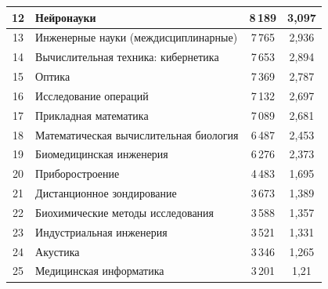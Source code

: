 \begin{table}
\begin{center}
\begin{tabular}{|c|l|c|c|}
\hline


12&Нейронауки&\hphantom{9}8\,189&3,097\\


\hline


13&Инженерные науки (междисциплинарные)&\hphantom{9}7\,765&2,936\\


\hline


14&Вычислительная техника: кибернетика&\hphantom{9}7\,653&2,894\\


\hline


15&Оптика&\hphantom{9}7\,369&2,787\\


\hline


16&Исследование операций&\hphantom{9}7\,132&2,697\\


\hline


17&Прикладная математика&\hphantom{9}7\,089&2,681\\


\hline


18&Математическая вычислительная биология&\hphantom{9}6\,487&2,453\\


\hline


19&Биомедицинская инженерия&\hphantom{9}6\,276&2,373\\


\hline


20&Приборостроение&\hphantom{9}4\,483&1,695\\


\hline


21&Дистанционное зондирование&\hphantom{9}3\,673&1,389\\


\hline


22&Биохимические методы исследования&\hphantom{9}3\,588&1,357\\


\hline


23&Индустриальная инженерия&\hphantom{9}3\,521&1,331\\


\hline


24&Акустика&\hphantom{9}3\,346&1,265\\


\hline


25&Медицинская информатика&\hphantom{9}3\,201&1,21\hphantom{9}\\


\hline



\end{tabular}
\end{center}
\end{table}

